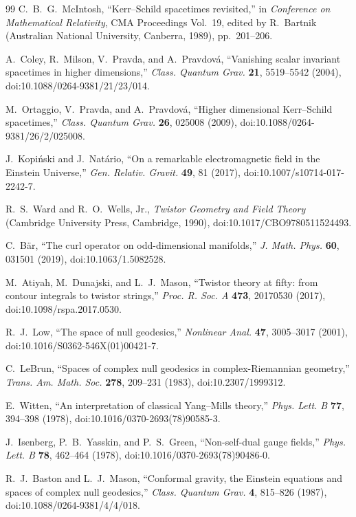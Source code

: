 \documentclass[aps,prd,reprint,nofootinbib,superscriptaddress]{revtex4-2}
\theoremstyle{definition}
\theoremstyle{remark}
\begin{document}
\begin{thebibliography}{99}
C.~B.~G.~McIntosh,
``Kerr--Schild spacetimes revisited,''
in \emph{Conference on Mathematical Relativity},
CMA Proceedings Vol.~19, edited by R.~Bartnik
(Australian National University, Canberra, 1989), pp.~201--206.

A.~Coley, R.~Milson, V.~Pravda, and A.~Pravdov\'a,
``Vanishing scalar invariant spacetimes in higher dimensions,''
\emph{Class. Quantum Grav.} \textbf{21}, 5519--5542 (2004),
doi:10.1088/0264-9381/21/23/014.

M.~Ortaggio, V.~Pravda, and A.~Pravdov\'a,
``Higher dimensional Kerr--Schild spacetimes,''
\emph{Class. Quantum Grav.} \textbf{26}, 025008 (2009),
doi:10.1088/0264-9381/26/2/025008.


J.~Kopi\'{n}ski and J.~Nat\'{a}rio,
``On a remarkable electromagnetic field in the Einstein Universe,''
\emph{Gen. Relativ. Gravit.} \textbf{49}, 81 (2017),
doi:10.1007/s10714-017-2242-7.

R.~S.~Ward and R.~O.~Wells, Jr.,
\emph{Twistor Geometry and Field Theory}
(Cambridge University Press, Cambridge, 1990),
doi:10.1017/CBO9780511524493.

C.~B\"ar,
``The curl operator on odd-dimensional manifolds,''
\emph{J. Math. Phys.} \textbf{60}, 031501 (2019),
doi:10.1063/1.5082528.

M.~Atiyah, M.~Dunajski, and L.~J.~Mason,
``Twistor theory at fifty: from contour integrals to twistor strings,''
\emph{Proc. R. Soc. A} \textbf{473}, 20170530 (2017),
doi:10.1098/rspa.2017.0530.


R.~J.~Low,
``The space of null geodesics,''
\emph{Nonlinear Anal.} \textbf{47}, 3005--3017 (2001),
doi:10.1016/S0362-546X(01)00421-7.

C.~LeBrun,
``Spaces of complex null geodesics in complex-Riemannian geometry,''
\emph{Trans. Am. Math. Soc.} \textbf{278}, 209--231 (1983),
doi:10.2307/1999312.

E.~Witten,
``An interpretation of classical Yang--Mills theory,''
\emph{Phys. Lett. B} \textbf{77}, 394--398 (1978),
doi:10.1016/0370-2693(78)90585-3.

J.~Isenberg, P.~B.~Yasskin, and P.~S.~Green,
``Non-self-dual gauge fields,''
\emph{Phys. Lett. B} \textbf{78}, 462--464 (1978),
doi:10.1016/0370-2693(78)90486-0.

R.~J.~Baston and L.~J.~Mason,
``Conformal gravity, the Einstein equations and spaces of complex null geodesics,''
\emph{Class. Quantum Grav.} \textbf{4}, 815--826 (1987),
doi:10.1088/0264-9381/4/4/018.


\end{thebibliography}
\end{document}
